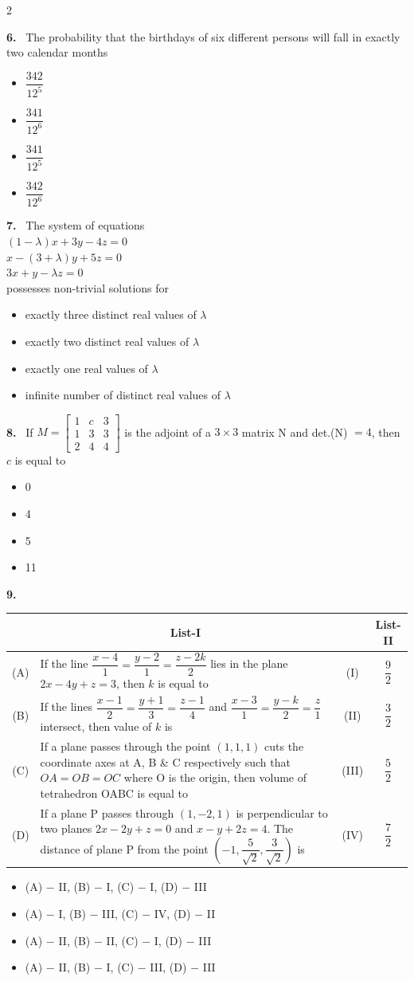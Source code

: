 \documentclass[10pt]{extarticle}
\newcommand{\qn}[1]{\par\smallskip\noindent\textbf{#1.}~}
\newenvironment{qoptions}{\begin{itemize}[leftmargin=1.8em,itemsep=1pt,topsep=2pt,label={}]}{\end{itemize}}
\newcommand{\opt}[2]{\item[(#1)] #2}
\begin{document}
\begin{multicols}{2}
\qn{6} The probability that the birthdays of six different persons will fall in exactly two calendar months
\begin{qoptions}
\opt{A}{$\dfrac{342}{12^5}$}
\opt{B}{$\dfrac{341}{12^6}$}
\opt{C}{$\dfrac{341}{12^5}$}
\opt{D}{$\dfrac{342}{12^6}$}
\end{qoptions}

\qn{7} The system of equations\\
$(1-\lambda)x+3y-4z=0$\\
$x-(3+\lambda)y+5z=0$\\
$3x+y-\lambda z=0$\\
possesses non-trivial solutions for
\begin{qoptions}
\opt{A}{exactly three distinct real values of $\lambda$}
\opt{B}{exactly two distinct real values of $\lambda$}
\opt{C}{exactly one real values of $\lambda$}
\opt{D}{infinite number of distinct real values of $\lambda$}
\end{qoptions}

\qn{8} If $M=\begin{bmatrix}1&c&3\\1&3&3\\2&4&4\end{bmatrix}$ is the adjoint of a $3\times3$ matrix N and det.(N) $=4$, then $c$ is equal to
\begin{qoptions}
\opt{A}{0}
\opt{B}{4}
\opt{C}{5}
\opt{D}{11}
\end{qoptions}

\qn{9} \par\nobreak
\begin{center}\small
\begin{tabular}{|c|p{3.6cm}|c|c|}\hline
 & \multicolumn{1}{c|}{\textbf{List-I}} & & \textbf{List-II}\\\hline
(A) & If the line $\dfrac{x-4}{1}=\dfrac{y-2}{1}=\dfrac{z-2k}{2}$ lies in the plane $2x-4y+z=3$, then $k$ is equal to & (I) & $\dfrac92$\\\hline
(B) & If the lines $\dfrac{x-1}{2}=\dfrac{y+1}{3}=\dfrac{z-1}{4}$ and $\dfrac{x-3}{1}=\dfrac{y-k}{2}=\dfrac{z}{1}$ intersect, then value of $k$ is & (II) & $\dfrac32$\\\hline
(C) & If a plane passes through the point $(1,1,1)$ cuts the coordinate axes at A, B \& C respectively such that $OA=OB=OC$ where O is the origin, then volume of tetrahedron OABC is equal to & (III) & $\dfrac52$\\\hline
(D) & If a plane P passes through $(1,-2,1)$ is perpendicular to two planes $2x-2y+z=0$ and $x-y+2z=4$. The distance of plane P from the point $\left(-1,\dfrac{5}{\sqrt2},\dfrac{3}{\sqrt2}\right)$ is & (IV) & $\dfrac72$\\\hline
\end{tabular}
\end{center}
\begin{qoptions}
\opt{A}{(A) $-$ II, (B) $-$ I, (C) $-$ I, (D) $-$ III}
\opt{B}{(A) $-$ I, (B) $-$ III, (C) $-$ IV, (D) $-$ II}
\opt{C}{(A) $-$ II, (B) $-$ II, (C) $-$ I, (D) $-$ III}
\opt{D}{(A) $-$ II, (B) $-$ I, (C) $-$ III, (D) $-$ III}
\end{qoptions}


\end{multicols}
\end{document}
